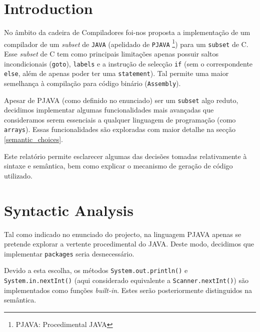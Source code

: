 \documentclass[a4paper]{article}
\title{\documentTitle}
\author{\documentAuthors{}}
\begin{document}
\renewcommand{\figurename}{Figure}
\renewcommand{\contentsname}{Contents}

\maketitle
\cleardoublepage

\tableofcontents
\cleardoublepage

\setlength{\parindent}{1cm}
\setlength{\parskip}{0.3cm}

\section{Introduction}
\indent \indent No âmbito da cadeira de Compiladores foi-nos proposta a implementação de um compilador de um \textit{subset} de \texttt{JAVA} (apelidado de
\texttt{PJAVA} \footnote[1]{PJAVA: Procedimental JAVA}) para um \texttt{subset} de C. Esse \textit{subset} de C tem como principais limitações
apenas possuir saltos incondicionais (\texttt{goto}), \texttt{labels} e a instrução de selecção \texttt{if} (sem o correspondente \texttt{else}, além de apenas poder
ter uma \texttt{statement}). Tal permite uma maior semelhança à compilação para código binário (\texttt{Assembly}).

\indent Apesar de PJAVA (como definido no enunciado) ser um \texttt{subset} algo reduto, decidimos implementar algumas funcionalidades mais avançadas que consideramos
serem essenciais a qualquer linguagem de programação (como \texttt{arrays}). Essas funcionalidades são exploradas com maior detalhe na secção \ref{semantic_choices}.

\indent Este relatório permite esclarecer algumas das decisões tomadas relativamente à sintaxe e semântica, bem como explicar o mecanismo de geração de código
utilizado.

\cleardoublepage

\section{Syntactic Analysis} %
\label{syntactic_analysis}
\indent \indent Tal como indicado no enunciado do projecto, na linguagem PJAVA apenas se pretende explorar a vertente procedimental do JAVA. 
Deste modo, decidimos que implementar \texttt{packages} seria desnecessário.

\indent Devido a esta escolha, os métodos \texttt{System.out.println()} e \texttt{System.in.nextInt()} (aqui considerado equivalente a \texttt{Scanner.nextInt()})
são implementados como funções \emph{built-in}. Estes serão posteriormente distinguidos na semântica.
\end{document}
